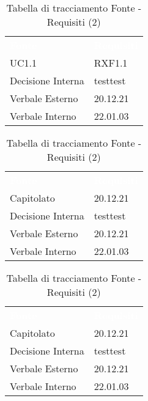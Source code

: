 \begin{table}[!htbp]
\renewcommand{\arraystretch}{1.5}
\begin{tabular}{ m{}<{\centering}  m{}<{\centering} }
	\rowcolor{darkblue}
	\textcolor{white}{\textbf{Fonte}} &\textcolor{white}{\textbf{Requisiti}}\\ 

	UC1.1 & RXF1.1\\	

	Decisione Interna & testtest\\
	
	Verbale Esterno & 20.12.21\\
	
	Verbale Interno & 22.01.03 \\

\end{tabular}
\begin{tabular}{ m{}<{\centering}  m{}<{\centering} }
	\rowcolor{darkblue}
	\textcolor{white}{\textbf{Fonte}} &\textcolor{white}{\textbf{Requisiti}}\\ 

	Capitolato & 20.12.21\\	

	Decisione Interna & testtest \\
	
	Verbale Esterno & 20.12.21\\
	
	Verbale Interno & 22.01.03 \\

\end{tabular}
\begin{tabular}{ m{}<{\centering}  m{}<{\centering} }
	\rowcolor{darkblue}
	\textcolor{white}{\textbf{Fonte}} &\textcolor{white}{\textbf{Requisiti}}\\ 

	Capitolato & 20.12.21\\	

	Decisione Interna & testtest \\
	
	Verbale Esterno & 20.12.21\\
	
	Verbale Interno & 22.01.03 \\

\end{tabular}
\caption{Tabella di tracciamento Fonte - Requisiti (2)}
\end{table}

